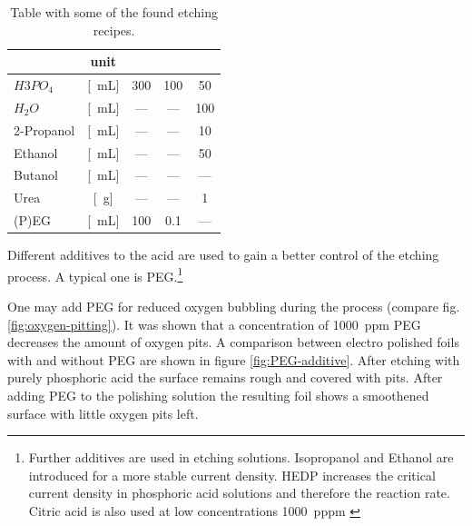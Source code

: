 \begin{table}[] \centering
	\caption{Table with some of the found etching recipes.}
	\begin{tabular}{lcccc}
		& unit 			& \cite{luo_effect_2011} & \cite{stables_report_2008} & \cite{bin_zhang_low-temperature_2012} \\ \hline 
		$H3PO_4$	&[\SI{}{\milli\liter}]  & 300   & 100	& 50 \\
		$H_2O$		&[\SI{}{\milli\liter}]	& ---	& ---	& 100 \\
		2-Propanol	&[\SI{}{\milli\liter}]	& ---	& ---	&  10 \\
		Ethanol		&[\SI{}{\milli\liter}]	& ---	& ---	&  50 \\
		Butanol		&[\SI{}{\milli\liter}]	& ---	& ---	& --- \\
		Urea		&[\SI{}{\gram}]		    & ---   & ---	& 1 \\
		(P)EG		&[\SI{}{\milli\liter}] 	& 100	& 0.1  	& --- \\
	\end{tabular}
	\label{tab:etching-recipes}
\end{table}
Different additives to the acid are used to gain a better control of the etching process.  A typical one is PEG.\footnote{Further additives are used in etching solutions. Isopropanol and Ethanol are introduced for a more stable current density. HEDP increases the critical current density in phosphoric acid solutions\cite{jinshan_electrochemical_2004} and therefore the reaction rate. Citric acid is also used at low concentrations \SI{1000}{pppm} \cite{chang_superpolishing_2003}}  

One may add PEG for reduced oxygen bubbling during the process (compare fig. \ref{fig:oxygen-pitting})\cite{stables_report_2008,chang_superpolishing_2003}. It was shown that a concentration of \SI{1000}{ppm} PEG decreases the amount of oxygen pits. A comparison between electro polished foils with and without PEG are shown in figure \ref{fig:PEG-additive}. After etching with purely phosphoric acid the surface remains rough and covered with pits. After adding PEG to the polishing solution the resulting foil shows a smoothened surface with little oxygen pits left.

